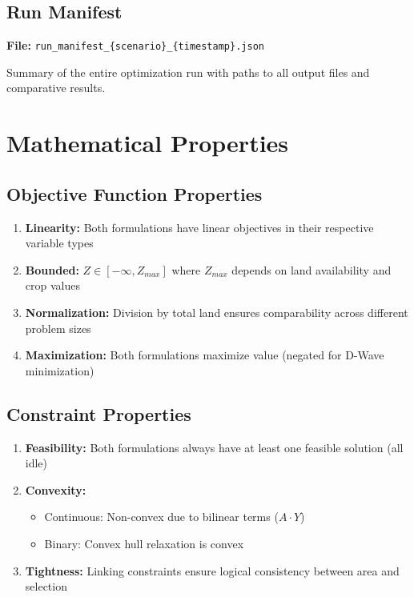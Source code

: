 \documentclass{article}
\begin{document}
\subsection{Run Manifest}

\textbf{File:} \texttt{run\_manifest\_\{scenario\}\_\{timestamp\}.json}

Summary of the entire optimization run with paths to all output files and comparative results.

\section{Mathematical Properties}

\subsection{Objective Function Properties}

\begin{enumerate}
    \item \textbf{Linearity:} Both formulations have linear objectives in their respective variable types
    \item \textbf{Bounded:} $Z \in [-\infty, Z_{max}]$ where $Z_{max}$ depends on land availability and crop values
    \item \textbf{Normalization:} Division by total land ensures comparability across different problem sizes
    \item \textbf{Maximization:} Both formulations maximize value (negated for D-Wave minimization)
\end{enumerate}

\subsection{Constraint Properties}

\begin{enumerate}
    \item \textbf{Feasibility:} Both formulations always have at least one feasible solution (all idle)
    \item \textbf{Convexity:} 
    \begin{itemize}
        \item Continuous: Non-convex due to bilinear terms ($A \cdot Y$)
        \item Binary: Convex hull relaxation is convex
    \end{itemize}
    \item \textbf{Tightness:} Linking constraints ensure logical consistency between area and selection
\end{enumerate}
\end{document}
